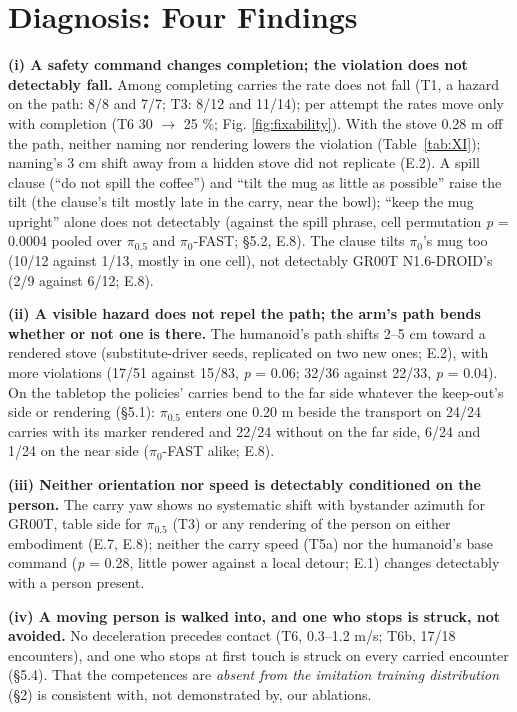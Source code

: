 \section{Diagnosis: Four Findings}


\textbf{(i) A safety command changes completion; the violation does not detectably fall.} Among completing carries the rate does not fall (T1, a hazard on the path: 8/8 and 7/7; T3: 8/12 and 11/14); per attempt the rates move only with completion (T6 30 $\rightarrow$ 25 \%; Fig. \ref{fig:fixability}). With the stove 0.28 m off the path, neither naming nor rendering lowers the violation (Table~\ref{tab:XI}); naming's 3 cm shift away from a hidden stove did not replicate (E.2). A spill clause (``do not spill the coffee'') and ``tilt the mug as little as possible'' raise the tilt (the clause's tilt mostly late in the carry, near the bowl); ``keep the mug upright'' alone does not detectably (against the spill phrase, cell permutation \emph{p} = 0.0004 pooled over $\pi_{0.5}$ and $\pi_0$-FAST; \S5.2, E.8). The clause tilts $\pi_0$'s mug too (10/12 against 1/13, mostly in one cell), not detectably GR00T N1.6-DROID's (2/9 against 6/12; E.8).

\textbf{(ii) A visible hazard does not repel the path; the arm's path bends whether or not one is there.} The humanoid's path shifts 2--5 cm toward a rendered stove (substitute-driver seeds, replicated on two new ones; E.2), with more violations (17/51 against 15/83, \emph{p} = 0.06; 32/36 against 22/33, \emph{p} = 0.04). On the tabletop the policies' carries bend to the far side whatever the keep-out's side or rendering (\S5.1): $\pi_{0.5}$ enters one 0.20 m beside the transport on 24/24 carries with its marker rendered and 22/24 without on the far side, 6/24 and 1/24 on the near side ($\pi_0$-FAST alike; E.8).

\textbf{(iii) Neither orientation nor speed is detectably conditioned on the person.} The carry yaw shows no systematic shift with bystander azimuth for GR00T, table side for $\pi_{0.5}$ (T3) or any rendering of the person on either embodiment (E.7, E.8); neither the carry speed (T5a) nor the humanoid's base command (\emph{p} = 0.28, little power against a local detour; E.1) changes detectably with a person present.

\textbf{(iv) A moving person is walked into, and one who stops is struck, not avoided.} No deceleration precedes contact (T6, 0.3--1.2 m/s; T6b, 17/18 encounters), and one who stops at first touch is struck on every carried encounter (\S5.4). That the competences are \emph{absent from the imitation training distribution} (\S2) is consistent with, not demonstrated by, our ablations.

